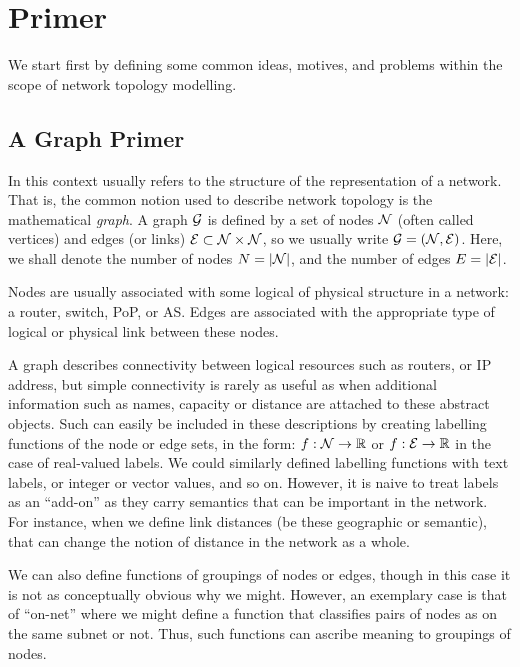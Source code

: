 \clearpage
\section{Primer}

We start first by defining some common ideas, motives, and problems
within the scope of network topology modelling. 

\subsection{A Graph Primer}

In this context  usually refers to the structure of
the  representation of a network. That is, the common
notion used to describe network topology is the mathematical {\em
  graph}.  A graph ${\cal G}$ is defined by a set of
nodes ${\cal N}$ (often called vertices) and edges (or links) ${\cal
  E} \subset {\cal N} \times {\cal N}$, so we usually write ${\cal G}
= ( {\cal N}, {\cal E})$.  Here, we shall denote the number of nodes
$N = |{\cal N}|$, and the number of edges $E = |{\cal E}|$.

Nodes are usually associated with some logical of physical structure
in a network: a router, switch, PoP, or AS. Edges are associated with
the appropriate type of logical or physical link between these nodes. 

A graph describes connectivity between logical resources such as
routers, or IP address, but simple connectivity is rarely as useful as
when additional information such as names, capacity or distance are
attached to these abstract objects. Such can easily be included in
these descriptions by creating labelling functions of the node or edge
sets, in the form: $f: {\cal N} \rightarrow \mathbb{R}$ or $f: {\cal E}
\rightarrow \mathbb{R}$ in the case of real-valued labels. We could similarly
defined labelling functions with text labels, or integer or vector
values, and so on. However, it is naive to treat labels as an
``add-on'' as they carry semantics that can be important in the
network. For instance, when we define link distances (be these
geographic or semantic), that can change the notion of distance in the
network as a whole.

We can also define functions of groupings of nodes or edges, though in
this case it is not as conceptually obvious why we might. However, an
exemplary case is that of ``on-net'' where we might define a function
that classifies pairs of nodes as on the same subnet or not. Thus,
such functions can ascribe meaning to groupings of nodes. 

